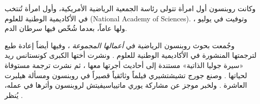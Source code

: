 \documentclass[../../../include/open-logic-section]{subfiles}
\begin{document}
وكانت روبنسون أول امرأة تتولى رئاسة الجمعية الرياضية الأمريكية، وأول
امرأة تُنتخب في الأكاديمية الوطنية للعلوم (National Academy of
Sciences). وتوفيت في  يوليو ، ولها  عاماً، بعدما شُخّص فيها سرطان
الدم.

\begin{reading}
وجُمعت بحوث روبنسون الرياضية في \textit{أعمالها المجموعة}
\citep{Robinson1996}، وفيها أيضاً إعادة طبع لترجمتها المنشورة في
الأكاديمية الوطنية للعلوم \citep{Feferman1994}. ونشرت أختها الكبرى
كونستانس ريد «سيرة جوليا الذاتية» مستندة إلى أحاديث أجرتها معها
\citep{Reid1986}، ثم نشرت ترجمة مستوفاة لحياتها \citep{Reid1996}. وصنع
جورج تشيشتشيري فيلماً وثائقياً قصيراً في روبنسون ومسألة هيلبرت العاشرة
\citep{Csicsery2016}. ولخبر موجز عن مشاركة يوري ماتيياسيفيتش لروبنسون
وأثرها في عمله، يُنظر \citep{Matijasevich1992}.
\end{reading}
\end{document}
